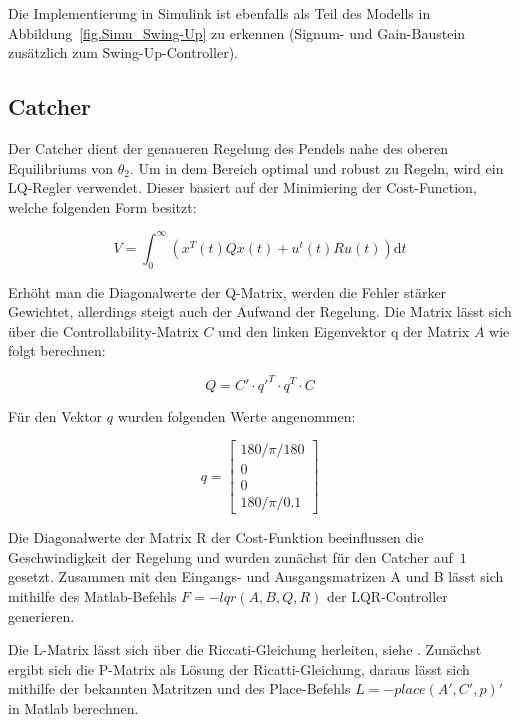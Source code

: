 Die Implementierung in Simulink ist ebenfalls als Teil des Modells in Abbildung~\ref{fig.Simu_Swing-Up} zu erkennen (Signum- und Gain-Baustein zusätzlich zum Swing-Up-Controller).


\subsection{Catcher}
\label{catcher} 

Der Catcher dient der genaueren Regelung des Pendels nahe des oberen Equilibriums von $ \theta_2 $. Um in dem Bereich optimal und robust zu Regeln, wird ein LQ-Regler verwendet. Dieser basiert auf der Minimiering der Cost-Function, welche folgenden Form besitzt:

\begin{equation}
 V = \int_0^\infty \! (x^T(t) Qx(t) + u^t(t) R u(t))  \mathrm{d}t
\end{equation}

Erhöht man die Diagonalwerte der Q-Matrix, werden die Fehler stärker Gewichtet, allerdings steigt auch der Aufwand der Regelung. Die Matrix lässt sich über die Controllability-Matrix $C$ und den linken Eigenvektor q der Matrix $A$
wie folgt berechnen:

\begin{equation}
 Q = C' \cdot q'^T \cdot q^T \cdot C
\end{equation}

Für den Vektor $q$ wurden folgenden Werte angenommen:

\begin{equation}
q =\begin{bmatrix}
         180/\pi/180 \\
         0\\
         0\\
         180/\pi/0.1
        \end{bmatrix}
\end{equation}
 
Die Diagonalwerte der Matrix R der Cost-Funktion beeinflussen die Geschwindigkeit der Regelung und wurden zunächst für den Catcher auf~$1$ gesetzt.
Zusammen mit den Eingangs- und Ausgangsmatrizen A und B lässt sich mithilfe des Matlab-Befehls $F = -lqr(A,B,Q,R)$ der LQR-Controller generieren.\citep{Werner.2013}

Die L-Matrix lässt sich über die Riccati-Gleichung herleiten, siehe \citep{Werner.2013}. Zunächst ergibt sich die P-Matrix als Lösung der Ricatti-Gleichung, daraus lässt sich mithilfe der bekannten Matritzen und des Place-Befehls $L=-place(A',C',p)'$ in Matlab berechnen.

